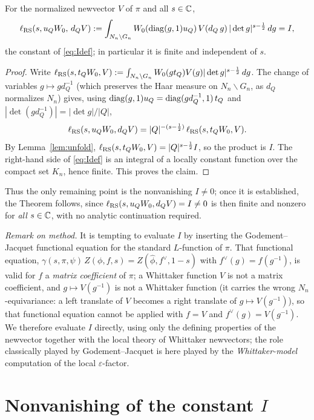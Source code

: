 \begin{qtwocorollary}\label{cor:sindep}
For the normalized newvector $V$ of $\pi$ and all $s\in\mathbb{C}$,
\[
\ell_{\mathrm{RS}}(s,u_Q W_0,\,d_Q V)
:=\int_{N_n\backslash G_n}W_0(\operatorname{diag}(g,1)u_Q)\,V(d_Q\, g)\,|\det g|^{s-\frac12}\,dg = I ,
\]
the constant of \eqref{eq:Idef}; in particular it is finite and independent of $s$.
\end{qtwocorollary}

\begin{proof}
Write $\ell_{\mathrm{RS}}(s,t_Q W_0,V):=\int_{N_n\backslash G_n}W_0(g t_Q)V(g)|\det g|^{s-\frac12}\,dg$.
The change of variables $g\mapsto g d_Q^{-1}$ \textup{(}which preserves the Haar measure on
$N_n\backslash G_n$, as $d_Q$ normalizes $N_n$\textup{)} gives, using
$\operatorname{diag}(g,1)u_Q=\operatorname{diag}(g d_Q^{-1},1)\,t_Q$ and $|\det(g d_Q^{-1})|=|\det g|/|Q|$,
\[
\ell_{\mathrm{RS}}(s,u_Q W_0,d_Q V)=|Q|^{-(s-\frac12)}\,\ell_{\mathrm{RS}}(s,t_Q W_0,V).
\]
By Lemma~\ref{lem:unfold}, $\ell_{\mathrm{RS}}(s,t_Q W_0,V)=|Q|^{s-\frac12}I$, so the product is $I$.
The right-hand side of \eqref{eq:Idef} is an integral of a locally constant function over the
compact set $K_n$, hence finite. This proves the claim.
\end{proof}

\noindent Thus the only remaining point is the nonvanishing $I\neq0$; once it is established, the
Theorem follows, since $\ell_{\mathrm{RS}}(s,u_Q W_0,d_Q V)=I\neq0$ is then finite and nonzero for
\emph{all} $s\in\mathbb{C}$, with no analytic continuation required.

\medskip
\noindent\emph{Remark on method.} It is tempting to evaluate $I$ by inserting the
Godement--Jacquet functional equation for the standard $L$-function of $\pi$. That functional
equation, $\gamma(s,\pi,\psi)\,Z(\phi,f,s)=Z(\widehat\phi,f^\vee,1-s)$ with
$f^\vee(g)=f(g^{-1})$, is valid for $f$ a \emph{matrix coefficient} of $\pi$; a Whittaker
function $V$ is not a matrix coefficient, and $g\mapsto V(g^{-1})$ is not a Whittaker function
\textup{(}it carries the wrong $N_n$-equivariance: a left translate of $V$ becomes a right
translate of $g\mapsto V(g^{-1})$\textup{)}, so that functional equation cannot be applied with
$f=V$ and $f^\vee(g)=V(g^{-1})$. We therefore evaluate $I$ directly, using only the defining
properties of the newvector together with the local theory of Whittaker newvectors; the role
classically played by Godement--Jacquet is here played by the \emph{Whittaker-model} computation
of the local $\varepsilon$-factor.

\section*{Nonvanishing of the constant $I$}

